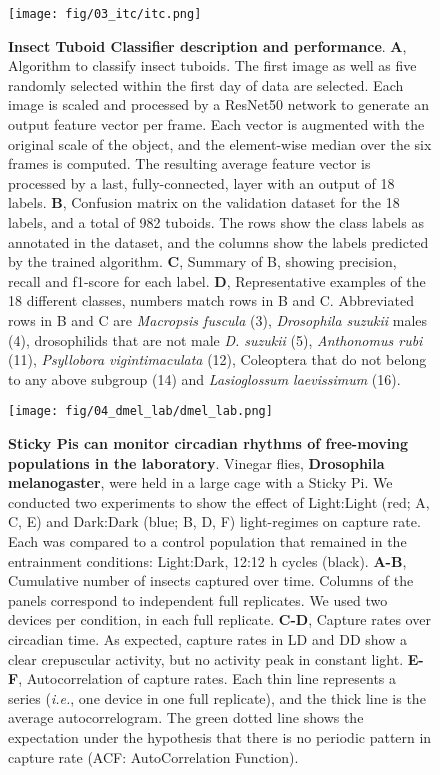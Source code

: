 \documentclass[fleqn,10pt]{wlscirep}
\begin{document}
\begin{figure}[ht]
	\centering
	\texttt{[image: fig/03\_itc/itc.png]}
	\caption{\textbf{Insect Tuboid Classifier description and performance}. \textbf{A}, Algorithm to classify insect tuboids. The first image as well as five randomly selected within the first day of data are selected. Each image is scaled and processed by a ResNet50 network to generate an output feature vector per frame. Each vector is augmented with the original scale of the object, and the element-wise median over the six frames is computed. The resulting average feature vector is processed by a last, fully-connected, layer with an output of 18 labels. \textbf{B}, Confusion matrix on the validation dataset for the 18 labels, and a total of 982 tuboids. The rows show the class labels as annotated in the dataset, and the columns show the labels predicted by the trained algorithm. \textbf{C}, Summary of B, showing precision, recall and f1-score for each label. \textbf{D}, Representative examples of the 18 different classes, numbers match rows in B and C. Abbreviated rows in B and C are \emph{Macropsis fuscula} (3), \emph{Drosophila suzukii} males (4), drosophilids that are not male \emph{D. suzukii} (5), \emph{Anthonomus rubi} (11), \emph{Psyllobora vigintimaculata} (12), Coleoptera that do not belong to any above subgroup (14) and \emph{Lasioglossum laevissimum} (16).}
	\label{fig:03}
\end{figure}

\pagebreak

\begin{figure}[ht]
	\centering
	\texttt{[image: fig/04\_dmel\_lab/dmel\_lab.png]}
	\caption{\textbf{Sticky Pis can monitor circadian rhythms of free-moving populations in the laboratory}. Vinegar flies, \textbf{Drosophila melanogaster}, were held in a large cage with a Sticky Pi. We conducted two experiments to show the effect of Light:Light (red; A, C, E) and Dark:Dark (blue; B, D, F) light-regimes on capture rate. Each was compared to a control population that remained in the entrainment conditions: Light:Dark, 12:12 h cycles (black). \textbf{A-B}, Cumulative number of insects captured over time. Columns of the panels correspond to independent full replicates. We used two devices per condition, in each full replicate. \textbf{C-D}, Capture rates over circadian time. As expected, capture rates in LD and DD show a clear crepuscular activity, but no activity peak in constant light. \textbf{E-F}, Autocorrelation of capture rates. Each thin line represents a series (\emph{i.e.}, one device in one full replicate), and the thick line is the average autocorrelogram. The green dotted line shows the expectation under the hypothesis that there is no periodic pattern in capture rate (ACF: AutoCorrelation Function).
	}
	\label{fig:04}
\end{figure}
\end{document}
